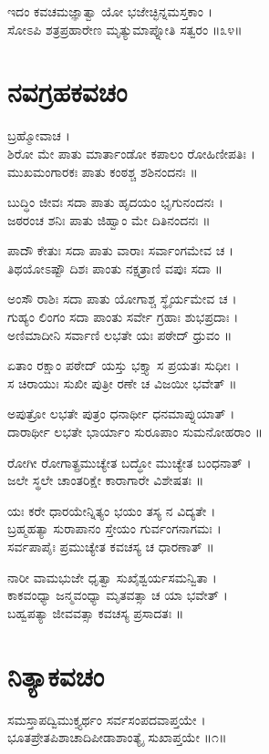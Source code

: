 ಇದಂ ಕವಚಮಜ್ಞಾತ್ವಾ ಯೋ ಭಜೇಚ್ಛಿನ್ನಮಸ್ತಕಾಂ ।\\
ಸೋಽಪಿ ಶತ್ರಪ್ರಹಾರೇಣ ಮೃತ್ಯುಮಾಪ್ನೋತಿ ಸತ್ವರಂ ॥೩೪॥

\section{ನವಗ್ರಹಕವಚಂ}

ಬ್ರಹ್ಮೋವಾಚ ।\\
ಶಿರೋ ಮೇ ಪಾತು ಮಾರ್ತಾಂಡೋ ಕಪಾಲಂ ರೋಹಿಣೀಪತಿಃ ।\\
ಮುಖಮಂಗಾರಕಃ ಪಾತು ಕಂಠಶ್ಚ ಶಶಿನಂದನಃ ॥

ಬುದ್ಧಿಂ ಜೀವಃ ಸದಾ ಪಾತು ಹೃದಯಂ ಭೃಗುನಂದನಃ ।\\
ಜಠರಂಚ ಶನಿಃ ಪಾತು ಜಿಹ್ವಾಂ ಮೇ ದಿತಿನಂದನಃ ॥

ಪಾದೌ ಕೇತುಃ ಸದಾ ಪಾತು ವಾರಾಃ ಸರ್ವಾಂಗಮೇವ ಚ ।\\
ತಿಥಯೋಽಷ್ಟೌ ದಿಶಃ ಪಾಂತು ನಕ್ಷತ್ರಾಣಿ ವಪುಃ ಸದಾ ॥

ಅಂಸೌ ರಾಶಿಃ ಸದಾ ಪಾತು ಯೋಗಾಶ್ಚ ಸ್ಥೈರ್ಯಮೇವ ಚ ।\\
ಗುಹ್ಯಂ ಲಿಂಗಂ ಸದಾ ಪಾಂತು ಸರ್ವೇ ಗ್ರಹಾಃ ಶುಭಪ್ರದಾಃ ।\\
ಅಣಿಮಾದೀನಿ ಸರ್ವಾಣಿ ಲಭತೇ ಯಃ ಪಠೇದ್ ಧ್ರುವಂ ॥

ಏತಾಂ ರಕ್ಷಾಂ ಪಠೇದ್ ಯಸ್ತು ಭಕ್ತ್ಯಾ ಸ ಪ್ರಯತಃ ಸುಧೀಃ ।\\
ಸ ಚಿರಾಯುಃ ಸುಖೀ ಪುತ್ರೀ ರಣೇ ಚ ವಿಜಯೀ ಭವೇತ್ ॥

ಅಪುತ್ರೋ ಲಭತೇ ಪುತ್ರಂ ಧನಾರ್ಥೀ ಧನಮಾಪ್ನುಯಾತ್ ।\\
ದಾರಾರ್ಥೀ ಲಭತೇ ಭಾರ್ಯಾಂ ಸುರೂಪಾಂ ಸುಮನೋಹರಾಂ ॥

ರೋಗೀ ರೋಗಾತ್ಪ್ರಮುಚ್ಯೇತ ಬದ್ಧೋ ಮುಚ್ಯೇತ ಬಂಧನಾತ್ ।\\
ಜಲೇ ಸ್ಥಲೇ ಚಾಂತರಿಕ್ಷೇ ಕಾರಾಗಾರೇ ವಿಶೇಷತಃ ॥

ಯಃ ಕರೇ ಧಾರಯೇನ್ನಿತ್ಯಂ ಭಯಂ ತಸ್ಯ ನ ವಿದ್ಯತೇ ।\\
ಬ್ರಹ್ಮಹತ್ಯಾ ಸುರಾಪಾನಂ ಸ್ತೇಯಂ ಗುರ್ವಂಗನಾಗಮಃ ।\\
ಸರ್ವಪಾಪೈಃ ಪ್ರಮುಚ್ಯೇತ ಕವಚಸ್ಯ ಚ ಧಾರಣಾತ್ ॥

ನಾರೀ ವಾಮಭುಜೇ ಧೃತ್ವಾ ಸುಖೈಶ್ವರ್ಯಸಮನ್ವಿತಾ ।\\
ಕಾಕವಂಧ್ಯಾ ಜನ್ಮವಂಧ್ಯಾ ಮೃತವತ್ಸಾ ಚ ಯಾ ಭವೇತ್ ।\\
ಬಹ್ವಪತ್ಯಾ ಜೀವವತ್ಸಾ ಕವಚಸ್ಯ ಪ್ರಸಾದತಃ ॥

\section{ನಿತ್ಯಾಕವಚಂ}
ಸಮಸ್ತಾಪದ್ವಿಮುಕ್ತ್ಯರ್ಥಂ ಸರ್ವಸಂಪದವಾಪ್ತಯೇ ।\\
ಭೂತಪ್ರೇತಪಿಶಾಚಾದಿಪೀಡಾಶಾಂತ್ಯೈ ಸುಖಾಪ್ತಯೇ ॥೧॥

